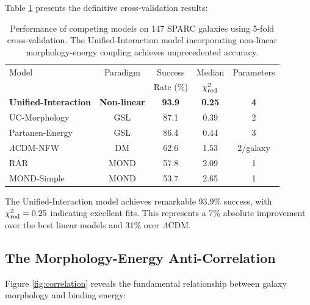 \documentclass[aps,prd,twocolumn,superscriptaddress,nofootinbib,longbibliography]{revtex4-2}
\begin{document}
Table \ref{tab:performance} presents the definitive cross-validation results:

\begin{table}[htbp]
\centering
\caption{Performance of competing models on 147 SPARC galaxies using 5-fold cross-validation. The Unified-Interaction model incorporating non-linear morphology-energy coupling achieves unprecedented accuracy.}
\label{tab:performance}
\begin{tabular}{lcccc}
\toprule
Model & Paradigm & Success & Median & Parameters \\
 & & Rate (\%) & $\chi^2_{\rm red}$ & \\
\midrule
\textbf{Unified-Interaction} & \textbf{Non-linear} & \textbf{93.9} & \textbf{0.25} & \textbf{4} \\
UC-Morphology & GSL & 87.1 & 0.39 & 2 \\
Partanen-Energy & GSL & 86.4 & 0.44 & 3 \\
$\Lambda$CDM-NFW & DM & 62.6 & 1.53 & 2/galaxy \\
RAR & MOND & 57.8 & 2.09 & 1 \\
MOND-Simple & MOND & 53.7 & 2.65 & 1 \\
\bottomrule
\end{tabular}
\end{table}

The Unified-Interaction model achieves remarkable 93.9\% success, with $\chi^2_{\rm red} = 0.25$ indicating excellent fits. This represents a 7\% absolute improvement over the best linear models and 31\% over $\Lambda$CDM.

\subsection{The Morphology-Energy Anti-Correlation}

Figure \ref{fig:correlation} reveals the fundamental relationship between galaxy morphology and binding energy:
\end{document}
